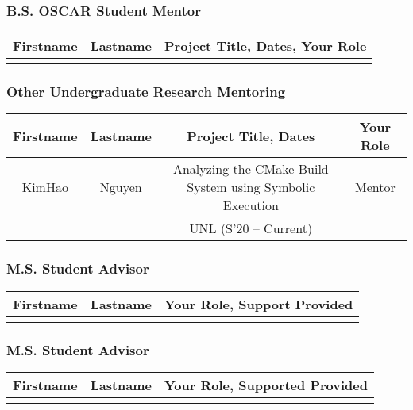 \documentclass[11pt]{article}
\begin{document}
\subsubsection{B.S. OSCAR Student Mentor}
\begin{center}
\begin{tabular}{ccc}
  \toprule
  \textbf{Firstname}&\textbf{Lastname}&\textbf{Project Title, Dates, Your Role}\\
  \midrule
                      & & \\
  \bottomrule
\end{tabular}
\end{center}

\subsubsection{Other Undergraduate Research Mentoring}
\begin{center}
\begin{tabular}{cccc}
  \toprule
  \textbf{Firstname}&\textbf{Lastname}&\textbf{Project Title, Dates}& \textbf{Your Role}\\
    \midrule
  KimHao& Nguyen& Analyzing the CMake Build System using Symbolic Execution&Mentor\\
  & & UNL (S'20 -- Current) &\\
  \bottomrule
\end{tabular}
\end{center}


\subsubsection{M.S. Student Advisor}
\begin{center}
  \begin{tabular}{ccc}
    \toprule
    \textbf{Firstname}&\textbf{Lastname}&\textbf{Your Role, Support Provided}\\
    \midrule
                      & & \\
    \bottomrule
  \end{tabular}
\end{center}



\subsubsection{M.S. Student Advisor}
\begin{center}
  \begin{tabular}{ccc}
    \toprule
    \textbf{Firstname}&\textbf{Lastname}&\textbf{Your Role, Supported Provided}\\
    \midrule
    & & \\
    \bottomrule
  \end{tabular}
\end{center}
\end{document}
